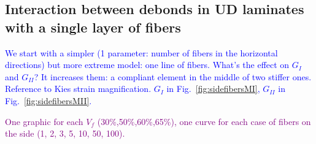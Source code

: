 \documentclass[review]{elsarticle}
\begin{document}
\subsection{Interaction between debonds in UD laminates with a single layer of fibers}

\textcolor{blue}{We start with a simpler (1 parameter: number of fibers in the horizontal directions) but more extreme model: one line of fibers. What's the effect on $G_{I}$ and $G_{II}$? It increases them: a compliant element in the middle of two stiffer ones. Reference to Kies strain magnification. $G_{I}$ in Fig.~\ref{fig:sidefibersMI}, $G_{II}$ in Fig.~\ref{fig:sidefibersMII}.}

\textcolor{purple}{One graphic for each $V_{f}$ (30\%,50\%,60\%,65\%), one curve for each case of fibers on the side (1, 2, 3, 5, 10, 50, 100).}\\
\end{document}
